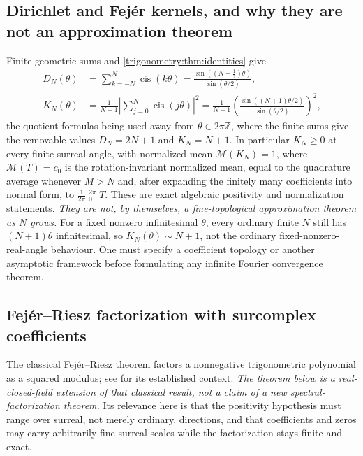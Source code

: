 \documentclass[11pt,letterpaper]{article}
\numberwithin{equation}{section}
\theoremstyle{definition}
\theoremstyle{remark}
\newcommand{\Z}{\mathbb Z}
\newcommand{\cis}{\operatorname{cis}}
\newcommand{\HInt}{\mathop{\overset{\scriptscriptstyle H}{\int}}\nolimits}
\begin{document}
\subsection{Dirichlet and Fej\'er kernels, and why they are not an approximation theorem}
Finite geometric sums and \cref{trigonometry:thm:identities} give
\begin{align}
 D_N(\theta)&=\sum_{k=-N}^N\cis(k\theta)=\frac{\sin((N+\tfrac12)\theta)}{\sin(\theta/2)},
 \label{trigonometry:eq:dirichlet}\\
 K_N(\theta)&=\frac1{N+1}\left|\sum_{j=0}^N\cis(j\theta)\right|^2
 =\frac1{N+1}\left(\frac{\sin((N+1)\theta/2)}{\sin(\theta/2)}\right)^2,
 \label{trigonometry:eq:fejerkernel}
\end{align}
the quotient formulas being used away from $\theta\in2\pi\Z$, where the finite sums give the
removable values $D_N=2N+1$ and $K_N=N+1$. In particular $K_N\ge0$ at every finite surreal angle,
with normalized mean $\mathcal M(K_N)=1$, where $\mathcal M(T)=c_0$ is the rotation-invariant
normalized mean, equal to the quadrature average whenever $M>N$ and, after expanding the finitely
many coefficients into normal form, to $\frac1{2\pi}\HInt_0^{2\pi}T$. These are exact algebraic
positivity and normalization statements. \emph{They are not, by themselves, a fine-topological
approximation theorem as $N$ grows.} For a fixed nonzero infinitesimal $\theta$, every ordinary
finite $N$ still has $(N+1)\theta$ infinitesimal, so $K_N(\theta)\sim N+1$, not the ordinary
fixed-nonzero-real-angle behaviour. One must specify a coefficient topology or another asymptotic
framework before formulating any infinite Fourier convergence theorem.

\subsection{Fej\'er--Riesz factorization with surcomplex coefficients}
The classical Fej\'er--Riesz theorem factors a nonnegative trigonometric polynomial as a squared
modulus; see \cite{DR} for its established context. \emph{The theorem below is a real-closed-field
extension of that classical result, not a claim of a new spectral-factorization theorem.} Its
relevance here is that the positivity hypothesis must range over surreal, not merely ordinary,
directions, and that coefficients and zeros may carry arbitrarily fine surreal scales while the
factorization stays finite and exact.
\end{document}
